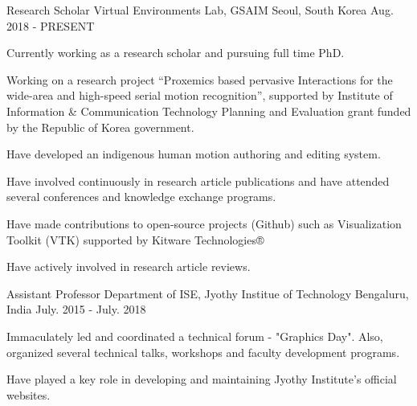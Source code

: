 

\begin{cventries}

  \cventry
    {Research Scholar} %
    {Virtual Environments Lab, GSAIM} %
    {Seoul, South Korea} %
    {Aug. 2018 - PRESENT} %
    {
      \begin{cvitems} %
        \item {Currently working as a research scholar and pursuing full time PhD.}
        \item {Working on a research project “Proxemics based pervasive Interactions for the wide-area and high-speed serial motion recognition”, supported by Institute of Information \& Communication Technology Planning and Evaluation grant funded by the Republic of Korea government. }
        \item {Have developed an indigenous human motion authoring and editing system.}
        \item {Have involved continuously in research article publications and have attended several conferences and knowledge exchange programs.}
        \item {Have made contributions to open-source projects (Github) such as Visualization Toolkit (VTK) supported by Kitware Technologies®}
        \item {Have actively involved in research article reviews.}
      \end{cvitems}
    }

  \cventry
    {Assistant Professor} %
    {Department of ISE, Jyothy Institue of Technology} %
    {Bengaluru, India} %
    {July. 2015 - July. 2018} %
    {
      \begin{cvitems} %
        \item {Immaculately led and coordinated a technical forum - "Graphics Day". Also, organized several technical talks, workshops and faculty development programs. }
        \item {Have played a key role in developing and maintaining Jyothy Institute's official websites.}
      \end{cvitems}
    }


\end{cventries}
